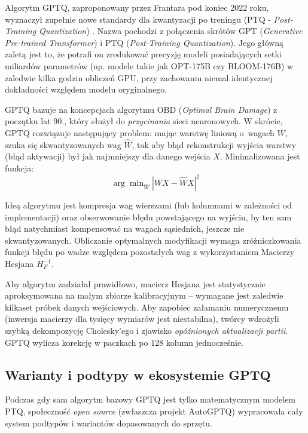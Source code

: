 Algorytm GPTQ, zaproponowany przez Frantara pod koniec 2022 roku, wyznaczył zupełnie nowe standardy dla kwantyzacji po treningu (PTQ - \textit{Post-Training Quantization}) \cite{frantar2023gptq}. Nazwa pochodzi z połączenia skrótów GPT (\textit{Generative Pre-trained Transformer}) i PTQ (\textit{Post-Training Quantization}). Jego główną zaletą jest to, że potrafi on zredukować precyzję modeli posiadających setki miliardów parametrów (np. modele takie jak OPT-175B czy BLOOM-176B) w zaledwie kilka godzin obliczeń GPU, przy zachowaniu niemal identycznej dokładności względem modelu oryginalnego.

GPTQ bazuje na koncepcjach algorytmu OBD (\textit{Optimal Brain Damage}) z początku lat 90., który służył do \textit{przycinania} sieci neuronowych. W skrócie, GPTQ rozwiązuje następujący problem: mając warstwę liniową o~wagach $W$, szuka się skwantyzowanych wag $\hat{W}$, tak aby błąd rekonstrukcji wyjścia warstwy (błąd aktywacji) był jak najmniejszy dla danego wejścia $X$. Minimalizowana jest funkcja:
\begin{equation}
    \arg\min\nolimits_{\hat{W}} | WX - \hat{W}X |^2
\end{equation}

Ideą algorytmu jest kompresja wag wierszami (lub kolumnami w zależności od implementacji) oraz obserwowanie błędu powstającego na wyjściu, by ten sam błąd natychmiast kompensować na wagach sąsiednich, jeszcze nie skwantyzowanych. Obliczanie optymalnych modyfikacji wymaga zróżniczkowania funkcji błędu po wadze względem pozostałych wag z wykorzystaniem Macierzy Hesjana $H_F^{-1}$.

Aby algorytm zadziałał prawidłowo, macierz Hesjana jest statystycznie aproksymowana na małym zbiorze kalibracyjnym – wymagane jest zaledwie kilkaset próbek danych wejściowych. Aby zapobiec załamaniu numerycznemu (inwersja macierzy dla tysięcy wymiarów jest niestabilna), twórcy wdrożyli szybką dekompozycję Cholesky'ego i zjawisko \textit{opóźnionych aktualizacji partii}. GPTQ wylicza korekcję w paczkach po 128 kolumn jednocześnie.

\subsection{Warianty i podtypy w ekosystemie GPTQ}

Podczas gdy sam algorytm bazowy GPTQ jest tylko matematycznym modelem PTQ, społeczność \textit{open source} (zwłaszcza projekt AutoGPTQ) wypracowała cały system podtypów i wariantów dopasowanych do sprzętu.

